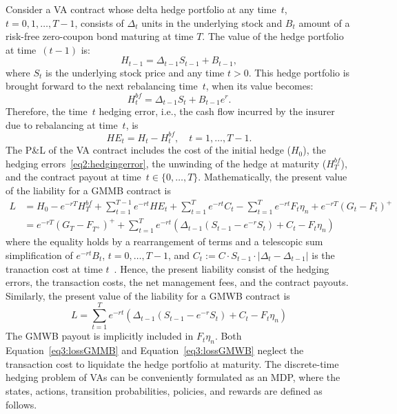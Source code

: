 Consider a VA contract whose delta hedge portfolio at any time~$t$, $t=0,1,\ldots,T-1$, consists of $\Delta_t$ units in the underlying stock and $B_t$ amount of a risk-free zero-coupon bond maturing at time $T$.
The value of the hedge portfolio at time~$(t-1)$ is:
\begin{equation*}
    H_{t-1} = \Delta_{t-1} S_{t-1} + B_{t-1},
\end{equation*}
where $S_t$ is the underlying stock price and any time $t>0$.
This hedge portfolio is brought forward to the next rebalancing time~$t$, when its value becomes:
\begin{equation*}
    H_{t}^{bf} = \Delta_{t-1} S_{t} + B_{t-1}e^{r}.
\end{equation*}
Therefore, the time~$t$ hedging error, i.e., the cash flow incurred by the insurer due to rebalancing at time~$t$, is
\begin{equation}
    HE_t = H_t - H^{bf}_t, \quad t=1,\ldots, T-1.
\end{equation}
The P\&L of the VA contract includes the cost of the initial hedge ($H_0$), the hedging errors~\eqref{eq2:hedgingerror}, the unwinding of the hedge at maturity ($H^{bf}_T$), and the contract payout at time~$t\in \{0,\ldots,T\}$.
Mathematically, the present value of the liability for a GMMB contract is 
\begin{align} \label{eq3:lossGMMB}
L   & = H_0 - e^{-rT} H^{bf}_T + \sum_{t=1}^{T-1} e^{-rt} HE_t + \sum_{t=1}^T e^{-rt} C_t - \sum_{t=1}^T e^{-rt} F_t\eta_n + e^{-rT} (G_t - F_t)^+  \nonumber \\ 
    & = e^{-rT} (G_T - F_{T^+})^+ + \sum_{t=1}^T e^{-rt}  \left( \Delta_{t-1} (S_{t-1} - e^{-r} S_t) + C_t - F_t\eta_n \right) 
\end{align}
where the equality holds by a rearrangement of terms and a telescopic sum simplification of $e^{-rt}B_t$, $t=0,\ldots,T-1$, and $C_t := C \cdot S_{t-1} \cdot |\Delta_t - \Delta_{t-1}|$ is the tranaction cost at time $t$~\citep{garleanu2013dynamic}.
Hence, the present liability consist of the hedging errors, the transaction costs, the net management fees, and the contract payouts.
Similarly, the present value of the liability for a GMWB contract is
\begin{equation} \label{eq3:lossGMWB}
L = \sum_{t=1}^T e^{-rt}  \left( \Delta_{t-1} (S_{t-1} - e^{-r} S_t) + C_t - F_t\eta_n \right)
\end{equation}
The GMWB payout is implicitly included in $F_t\eta_n$.
Both Equation~\ref{eq3:lossGMMB} and Equation~\ref{eq3:lossGMWB} neglect the transaction cost to liquidate the hedge portfolio at maturity.
The discrete-time hedging problem of VAs can be conveniently formulated as an MDP, where the states, actions, transition probabilities, policies, and rewards are defined as follows.

